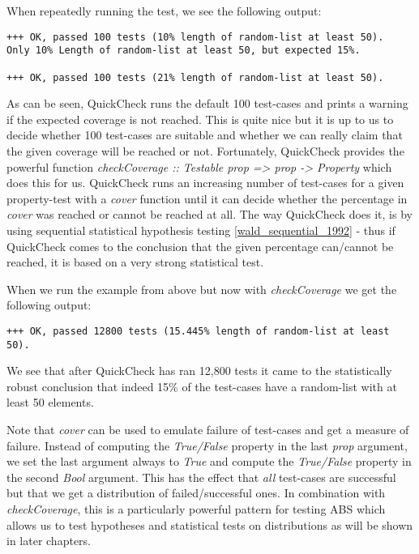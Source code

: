 When repeatedly running the test, we see the following output:

\begin{verbatim}
+++ OK, passed 100 tests (10% length of random-list at least 50).
Only 10% Length of random-list at least 50, but expected 15%.

+++ OK, passed 100 tests (21% length of random-list at least 50).
\end{verbatim}

As can be seen, QuickCheck runs the default 100 test-cases and prints a warning if the expected coverage is not reached. This is quite nice but it is up to us to decide whether 100 test-cases are suitable and whether we can really claim that the given coverage will be reached or not. Fortunately, QuickCheck provides the powerful function \textit{checkCoverage :: Testable prop => prop -> Property} which does this for us. QuickCheck runs an increasing number of test-cases for a given property-test with a \textit{cover} function until it can decide whether the percentage in \textit{cover} was reached or cannot be reached at all. The way QuickCheck does it, is by using sequential statistical hypothesis testing \ref{wald_sequential_1992} - thus if QuickCheck comes to the conclusion that the given percentage can/cannot be reached, it is based on a very strong statistical test.

When we run the example from above but now with \textit{checkCoverage} we get the following output:

\begin{verbatim}
+++ OK, passed 12800 tests (15.445% length of random-list at least 50).
\end{verbatim}

We see that after QuickCheck has ran 12,800 tests it came to the statistically robust conclusion that indeed 15\% of the test-cases have a random-list with at least 50 elements. 

Note that \textit{cover} can be used to emulate failure of test-cases and get a measure of failure. Instead of computing the \textit{True/False} property in the last \textit{prop} argument, we set the last argument always to \textit{True} and compute the \textit{True/False} property in the second \textit{Bool} argument. This has the effect that \textit{all} test-cases are successful but that we get a distribution of failed/successful ones. In combination with \textit{checkCoverage}, this is a particularly powerful pattern for testing ABS which allows us to test hypotheses and statistical tests on distributions as will be shown in later chapters.